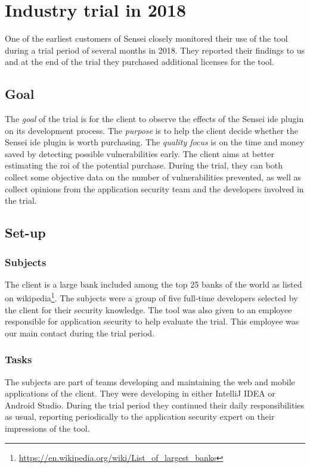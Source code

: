 \section{Industry trial in 2018}
\label{sec:trial2018}

One of the earliest customers of Sensei closely monitored their use of the tool during a trial period of several months in 2018.
They reported their findings to us and at the end of the trial they purchased additional licenses for the tool.

\subsection{Goal}
The \textit{goal} of the trial is for the client to observe the effects of the Sensei \gls{ide} plugin on its development process.
The \textit{purpose} is to help the client decide whether the Sensei \gls{ide} plugin is worth purchasing.
The \textit{quality focus} is on the time and money saved by detecting possible vulnerabilities early.
The client aims at better estimating the \gls{roi} of the potential purchase.
During the trial, they can both collect some objective data on the number of vulnerabilities prevented, as well as collect opinions from the application security team and the developers involved in the trial.

\subsection{Set-up}
\subsubsection{Subjects}
The client is a large bank included among the top 25 banks of the world as listed on wikipedia\footnote{\url{https://en.wikipedia.org/wiki/List\_of\_largest\_banks}}. The subjects were a group of five full-time developers selected by the client for their security knowledge. The tool was also given to an employee responsible for application security to help evaluate the trial. This employee was our main contact during the trial period.

\subsubsection{Tasks}
The subjects are part of teams developing and maintaining the web and mobile applications of the client. They were developing in either IntelliJ IDEA or Android Studio. During the trial period they continued their daily responsibilities as usual, reporting periodically to the application security expert on their impressions of the tool.

